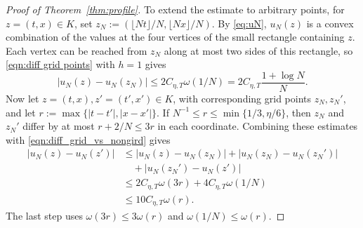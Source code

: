 \documentclass[11pt,letterpaper,reqno]{amsart}
\numberwithin{equation}{section}
\theoremstyle{plain}
\theoremstyle{remark}
\newcommand{\floor}[1]{\lfloor#1\rfloor}
\begin{document}
\begin{proof}[Proof of Theorem~\ref{thm:profile}]
To extend the estimate to arbitrary points, for $z=(t,x)\in K$, set $z_N:=(\floor{Nt}/N,\floor{Nx}/N)$. By \eqref{eq:uN}, $u_N(z)$ is a convex combination of the values at the four vertices of the small rectangle containing $z$. Each vertex can be reached from $z_N$ along at most two sides of this rectangle, so \eqref{eqn:diff grid points} with $h=1$ gives
\begin{equation}\label{eqn:diff_grid_vs_nongird}
   |u_N(z)-u_N(z_N)|
 \le 2C_{\eta,T}\omega(1/N)
 =2C_{\eta,T}\frac{1+\log N}{N}.
\end{equation}
Now let $z=(t,x),z'=(t',x')\in K$, with corresponding grid points $z_N,z_N'$, and let $r := \max\{|t-t'|,|x-x'|\}$. If $N^{-1}\le r\le\min\{1/3,\eta/6\}$, then $z_N$ and $z_N'$ differ by at most $r+2/N\le3r$ in each coordinate. Combining these estimates with \eqref{eqn:diff_grid_vs_nongird} gives
\[
 \begin{split}
 |u_N(z)-u_N(z')|
 &\le |u_N(z)-u_N(z_N)|+|u_N(z_N)-u_N(z_N')|\\
 &\quad+|u_N(z_N')-u_N(z')|\\
 &\le 2C_{\eta,T}\omega(3r)+4C_{\eta,T}\omega(1/N)\\
 &\le 10C_{\eta,T}\omega(r).
 \end{split}
\]
The last step uses $\omega(3r)\le3\omega(r)$ and
$\omega(1/N)\le\omega(r)$.


\end{proof}
\end{document}
